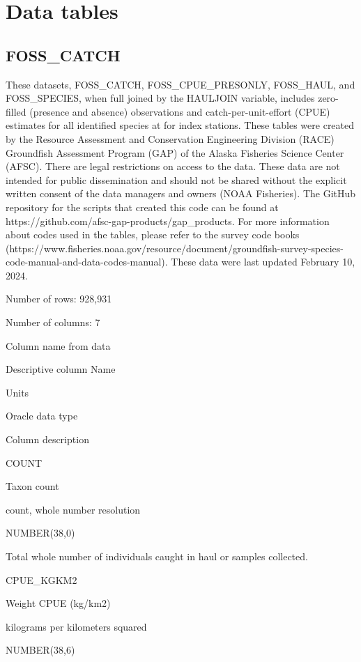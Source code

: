 \documentclass[
  letterpaper,
  oneside,
  open=any]{scrbook}
\begin{document}
\hypertarget{data-tables-2}{%
\section{Data tables}\label{data-tables-2}}

\hypertarget{foss_catch}{%
\subsection{FOSS\_CATCH}\label{foss_catch}}

These datasets, FOSS\_CATCH, FOSS\_CPUE\_PRESONLY, FOSS\_HAUL, and
FOSS\_SPECIES, when full joined by the HAULJOIN variable, includes
zero-filled (presence and absence) observations and
catch-per-unit-effort (CPUE) estimates for all identified species at for
index stations. These tables were created by the Resource Assessment and
Conservation Engineering Division (RACE) Groundfish Assessment Program
(GAP) of the Alaska Fisheries Science Center (AFSC). There are legal
restrictions on access to the data. These data are not intended for
public dissemination and should not be shared without the explicit
written consent of the data managers and owners (NOAA Fisheries). The
GitHub repository for the scripts that created this code can be found at
https://github.com/afsc-gap-products/gap\_products. For more information
about codes used in the tables, please refer to the survey code books
(https://www.fisheries.noaa.gov/resource/document/groundfish-survey-species-code-manual-and-data-codes-manual).
These data were last updated February 10, 2024.

Number of rows: 928,931

Number of columns: 7

Column name from data

Descriptive column Name

Units

Oracle data type

Column description

COUNT

Taxon count

count, whole number resolution

NUMBER(38,0)

Total whole number of individuals caught in haul or samples collected.

CPUE\_KGKM2

Weight CPUE (kg/km2)

kilograms per kilometers squared

NUMBER(38,6)
\end{document}
